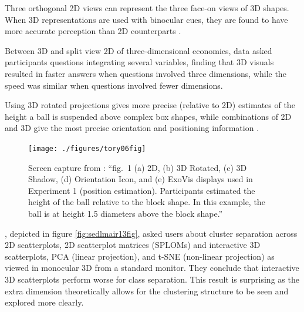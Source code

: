 \documentclass{template/monashthesis}
\begin{document}
Three orthogonal 2D views can represent the three face-on views of 3D shapes. When 3D representations are used with binocular cues, they are found to have more accurate perception than 2D counterparts \autocite{lee_effects_1986}.

Between 3D and split view 2D of three-dimensional economics, data \textcite{wickens_implications_1994} asked participants questions integrating several variables, finding that 3D visuals resulted in faster answers when questions involved three dimensions, while the speed was similar when questions involved fewer dimensions.

Using 3D rotated projections gives more precise (relative to 2D) estimates of the height a ball is suspended above complex box shapes, while combinations of 2D and 3D give the most precise orientation and positioning information \autocite[depicted in figure \ref{fig:tory06fig}]{tory_visualization_2006}.



\begin{figure}

{\centering \texttt{[image: ./figures/tory06fig]} 

}

\caption{Screen capture from \textcite{tory_visualization_2006}: ``fig.~1 (a) 2D, (b) 3D Rotated, (c) 3D Shadow, (d) Orientation Icon, and (e) ExoVis displays used in Experiment 1 (position estimation). Participants estimated the height of the ball relative to the block shape. In this example, the ball is at height 1.5 diameters above the block shape.''}\label{fig:tory06fig}
\end{figure}

\textcite{sedlmair_empirical_2013}, depicted in figure \ref{fig:sedlmair13fig}, asked users about cluster separation across 2D scatterplots, 2D scatterplot matrices (SPLOMs) and interactive 3D scatterplots, PCA (linear projection), and t-SNE (non-linear projection) as viewed in monocular 3D from a standard monitor. They conclude that interactive 3D scatterplots perform worse for class separation. This result is surprising as the extra dimension theoretically allows for the clustering structure to be seen and explored more clearly.
\end{document}
